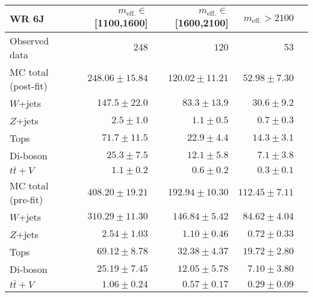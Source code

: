 \begin{table}
  \begin{center}
    \caption{ \label{tab::BGestimation::CRyields_6J}   }

    \begin{tabular*}{\textwidth}{@{\extracolsep{\fill}}lrrrr}
      \toprule
      \textbf{WR 6J} &  $m_{\mathrm{eff.}}\in$[1100,1600] & $m_{\mathrm{eff.}}\in$[1600,2100] & $m_{\mathrm{eff.}}>2100$ \\
      \midrule

Observed data          & $248$              & $120$              & $53$                    \\
\midrule
\midrule
MC total (post-fit)         & $248.06 \pm 15.84$          & $120.02 \pm 11.21$          & $52.98 \pm 7.30$              \\
\midrule
        $W$+jets         & $147.5 \pm 22.0$          & $83.3 \pm 13.9$          & $30.6 \pm 9.2$              \\
        $Z$+jets         & $2.5 \pm 1.0$          & $1.1 \pm 0.5$          & $0.7 \pm 0.3$              \\
        Tops         & $71.7 \pm 11.5$          & $22.9 \pm 4.4$          & $14.3 \pm 3.1$              \\
        Di-boson         & $25.3 \pm 7.5$          & $12.1 \pm 5.8$          & $7.1 \pm 3.8$              \\
        $t\bar{t}+V$         & $1.1 \pm 0.2$          & $0.6 \pm 0.2$          & $0.3 \pm 0.1$              \\
\midrule
\midrule
MC total (pre-fit)              & $408.20 \pm 19.21$          & $192.94 \pm 10.30$          & $112.45 \pm 7.11$              \\
\midrule
        $W$+jets         & $310.29 \pm 11.30$          & $146.84 \pm 5.42$          & $84.62 \pm 4.04$              \\
        $Z$+jets         & $2.54 \pm 1.03$          & $1.10 \pm 0.46$          & $0.72 \pm 0.33$              \\
        Tops         & $69.12 \pm 8.78$          & $32.38 \pm 4.37$          & $19.72 \pm 2.80$              \\
        Di-boson         & $25.19 \pm 7.45$          & $12.05 \pm 5.78$          & $7.10 \pm 3.80$              \\
        $t\bar{t}+V$         & $1.06 \pm 0.24$          & $0.57 \pm 0.17$          & $0.29 \pm 0.09$              \\
    \bottomrule
    \end{tabular*}



\end{center}
\end{table}
